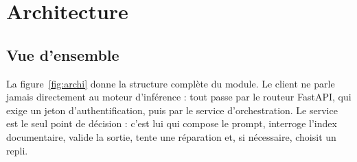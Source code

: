 \section{Architecture}
\label{sec:archi}

\subsection{Vue d'ensemble}

La figure~\ref{fig:archi} donne la structure complète du module. Le client ne
parle jamais directement au moteur d'inférence : tout passe par le routeur
FastAPI, qui exige un jeton d'authentification, puis par le service
d'orchestration. Le service est le seul point de décision : c'est lui qui
compose le prompt, interroge l'index documentaire, valide la sortie, tente une
réparation et, si nécessaire, choisit un repli.

